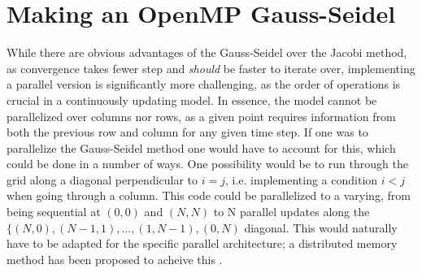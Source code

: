 \documentclass{article}
\begin{document}
\section{Making an OpenMP Gauss-Seidel}
While there are obvious advantages of the Gauss-Seidel over the Jacobi method, as convergence takes fewer step and \emph{should} be faster to iterate over, implementing a parallel version is significantly more challenging, as the order of operations is crucial in a continuously updating model. In essence, the model cannot be parallelized over columns nor rows, as a given point requires information from both the previous row and column for any given time step. If one was to parallelize the Gauss-Seidel method one would have to account for this, which could be done in a number of ways. One possibility would be to run through the grid along a diagonal perpendicular to $i=j$, i.e. implementing a condition $i<j$ when going through a column. This code could be parallelized to a varying, from being sequential at $(0,0)$ and $(N,N)$ to N parallel updates along the $\{(N,0),(N-1,1),...,(1,N-1),(0,N)$ diagonal. This would naturally have to be adapted for the specific parallel architecture; a distributed memory method has been proposed to acheive this \cite{SHANG20091369}.


\end{document}
